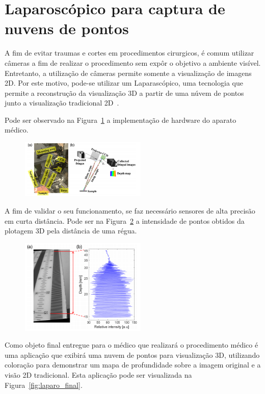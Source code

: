 \documentclass[letterpaper, 10 pt, conference]{ieeeconf}
\begin{document}
\section{Laparoscópico para captura de nuvens de pontos}


A fim de evitar traumas e cortes em procedimentos cirurgicos, é comum utilizar câmeras a fim de realizar o procedimento sem expôr o objetivo a ambiente visível.
%
Entretanto, a utilização de câmeras permite somente a visualização de imagens 2D.
%
Por este motivo, pode-se utilizar um Laparascópico, uma tecnologia que permite a reconstrução da visualização 3D a partir de uma núvem de pontos junto a visualização tradicional 2D~\cite{Le2018May}.

Pode ser observado na Figura~\ref{fig:laparoscopico} a implementação de hardware do aparato médico.

\begin{figure}[htb]
\label{fig:laparoscopico}
\includegraphics[width=6cm]{./img/laparoscopico.png}
\centering
\end{figure}

A fim de validar o seu funcionamento, se faz necessário sensores de alta precisão em curta distância.
%
Pode ser na Figura~\ref{fig:distancia} a intensidade de pontos obtidos da plotagem 3D pela distância de uma régua.


\begin{figure}[htb]
\label{fig:distancia}
\includegraphics[width=6cm]{./img/distancia.png}
\centering
\end{figure}

Como objeto final entregue para o médico que realizará o procedimento médico é uma aplicação que exibirá uma nuvem de pontos para visualização 3D,
utilizando coloração para demonstrar um mapa de profundidade sobre a imagem original e a visão 2D tradicional.
%
Esta aplicação pode ser visualizada na Figura~\ref{fig:laparo_final}.
\end{document}
